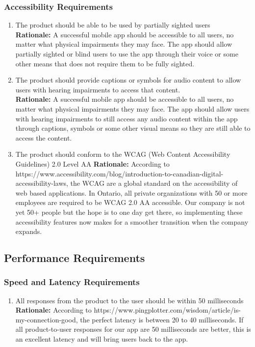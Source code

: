 \documentclass[]{article}
\begin{document}
\subsubsection{Accessibility Requirements}
\label{ssub:accessibility_requirements}
\begin{enumerate}[{UH-A}1. ]
	\item The product should be able to be used by partially sighted users \\
	{\bf Rationale:} A successful mobile app should be accessible to all users, no matter what physical impairments they may face. The app should allow partially sighted or blind users to use the app through their voice or some other means that does not require them to be fully sighted.
	\item The product should provide captions or symbols for audio content to allow users with hearing impairments to access that content. \\
	{\bf Rationale:} A successful mobile app should be accessible to all users, no matter what physical impairments they may face. The app should allow users with hearing impairments to still access any audio content within the app through captions, symbols or some other visual means so they are still able to access the content.
	\item The product should conform to the WCAG (Web Content Accessibility Guidelines) 2.0 Level AA 
	{\bf Rationale:} According to https://www.accessibility.com/blog/introduction-to-canadian-digital-accessibility-laws, the WCAG are a global standard on the accessibility of web based applications. In Ontario, all private organizations with 50 or more employees are required to be WCAG 2.0 AA accessible. Our company is not yet 50+ people but the hope is to one day get there, so implementing these accessibility features now makes for a smoother transition when the company expands.
\end{enumerate}


\subsection{Performance Requirements}
\label{sub:performance_requirements}

\subsubsection{Speed and Latency Requirements}
\label{ssub:speed_and_latency_requirements}
\begin{enumerate}[{PR-SL}1. ]
	\item All responses from the product to the user should be within 50 milliseconds \\
	{\bf Rationale:} According to https://www.pingplotter.com/wisdom/article/is-my-connection-good, the perfect latency is between 20 to 40 milliseconds. If all product-to-user responses for our app are 50 milliseconds are better, this is an excellent latency and will bring users back to the app.
\end{enumerate}
\end{document}
